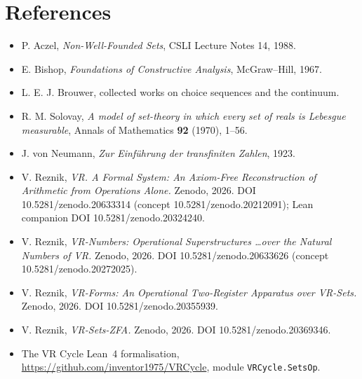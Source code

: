 \documentclass[11pt]{article}
\theoremstyle{remark}
\begin{document}
\section*{References}
\begin{itemize}
\item P. Aczel, \emph{Non-Well-Founded Sets}, CSLI Lecture Notes 14, 1988.
\item E. Bishop, \emph{Foundations of Constructive Analysis}, McGraw--Hill, 1967.
\item L. E. J. Brouwer, collected works on choice sequences and the continuum.
\item R. M. Solovay, \emph{A model of set-theory in which every set of reals is Lebesgue measurable},
Annals of Mathematics \textbf{92} (1970), 1--56.
\item J. von Neumann, \emph{Zur Einf\"uhrung der transfiniten Zahlen}, 1923.
\item V. Reznik, \emph{VR. A Formal System: An Axiom-Free Reconstruction of Arithmetic from Operations Alone.} Zenodo, 2026. DOI 10.5281/zenodo.20633314 (concept 10.5281/zenodo.20212091); Lean companion DOI 10.5281/zenodo.20324240.
\item V. Reznik, \emph{VR-Numbers: Operational Superstructures \dots over the Natural Numbers of VR.} Zenodo, 2026. DOI 10.5281/zenodo.20633626 (concept 10.5281/zenodo.20272025).
\item V. Reznik, \emph{VR-Forms: An Operational Two-Register Apparatus over VR-Sets.} Zenodo, 2026. DOI 10.5281/zenodo.20355939.
\item V. Reznik, \emph{VR-Sets-ZFA.} Zenodo, 2026. DOI 10.5281/zenodo.20369346.
\item The VR Cycle Lean~4 formalisation, \url{https://github.com/inventor1975/VRCycle}, module \texttt{VRCycle.SetsOp}.
\end{itemize}
\end{document}
